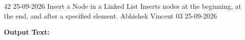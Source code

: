\clearpage
\label{prog:42}
\programhead
  {42}
  {25-09-2026}
  {Insert a Node in a Linked List}
  {Inserts nodes at the beginning, at the end, and after a specified element.}
  {Abhishek Vincent}
  {03}
  {25-09-2026}

\divider
\textbf{Output Text:}\par
\vspace{2pt}

